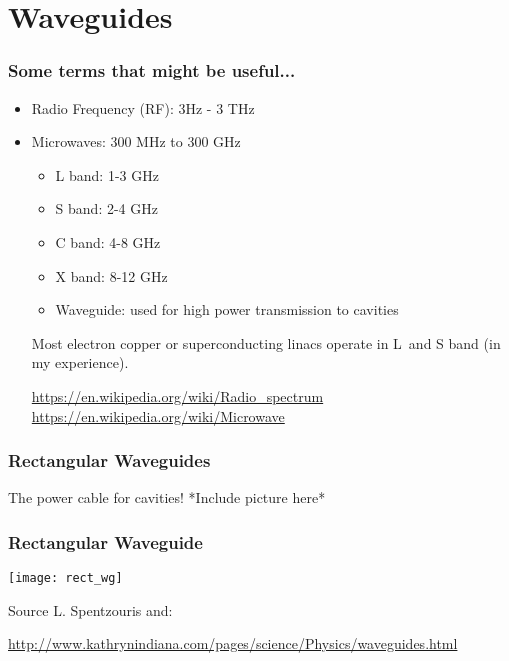 \documentclass[professionalfonts,t]{beamer}
\begin{document}
\section{Waveguides}
\begin{frame}
\frametitle{Some terms that might be useful...}
\begin{itemize}
	\item Radio Frequency (RF): 3Hz - 3 THz
	\item Microwaves: 300 MHz to 300 GHz 
	\begin{itemize}
		\item L band: 1-3 GHz
		\item S band: 2-4 GHz
		\item C band: 4-8 GHz
		\item X band: 8-12 GHz
	\item Waveguide: used for high power transmission to cavities
	\end{itemize}

\vspace{1em}

Most electron copper or superconducting linacs 
operate in L~and S band (in my experience). 

\vspace{1em}
\url{https://en.wikipedia.org/wiki/Radio_spectrum}
\url{https://en.wikipedia.org/wiki/Microwave}
\end{itemize}
\end{frame}


\begin{frame}
	\frametitle{Rectangular Waveguides}
	The power cable for cavities!
	*Include picture here*
\end{frame}
\begin{frame}
\frametitle{Rectangular Waveguide}
\begin{center}
	\texttt{[image: rect\_wg]}
\end{center}

Source L. Spentzouris and:

\tiny\url{http://www.kathrynindiana.com/pages/science/Physics/waveguides.html}
\end{frame}
\end{document}
